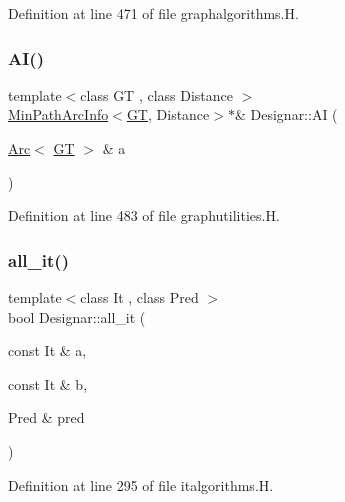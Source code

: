 Definition at line 471 of file graphalgorithms.\+H.

\mbox{\label{namespace_designar_a34a01d7c7eb615d616c2077f3b5473ea}} 
\subsubsection{\texorpdfstring{A\+I()}{AI()}}
{\footnotesize\ttfamily template$<$class GT , class Distance $>$ \\
\hyperlink{class_designar_1_1_min_path_arc_info}{Min\+Path\+Arc\+Info}$<$\hyperlink{demo-buildgraph_8_c_a3001c40d2c31ca87ed96cd7d1334a55e}{GT}, Distance$>$$\ast$\& Designar\+::\+AI (\begin{DoxyParamCaption}\item[{\hyperlink{namespace_designar_a3f55fb5513d62ff47cbc8f72b8e95d6f}{Arc}$<$ \hyperlink{demo-buildgraph_8_c_a3001c40d2c31ca87ed96cd7d1334a55e}{GT} $>$ \&}]{a }\end{DoxyParamCaption})\hspace{0.3cm}{\ttfamily [inline]}}



Definition at line 483 of file graphutilities.\+H.

\mbox{\label{namespace_designar_a1e8a8bf79e4dba3316207968f5c9ee27}} 
\subsubsection{\texorpdfstring{all\+\_\+it()}{all\_it()}\hspace{0.1cm}{\footnotesize\ttfamily [1/2]}}
{\footnotesize\ttfamily template$<$class It , class Pred $>$ \\
bool Designar\+::all\+\_\+it (\begin{DoxyParamCaption}\item[{const It \&}]{a,  }\item[{const It \&}]{b,  }\item[{Pred \&}]{pred }\end{DoxyParamCaption})}



Definition at line 295 of file italgorithms.\+H.

\mbox{\label{namespace_designar_ab48bfea523a4a61cd62aa56fff325920}} 
